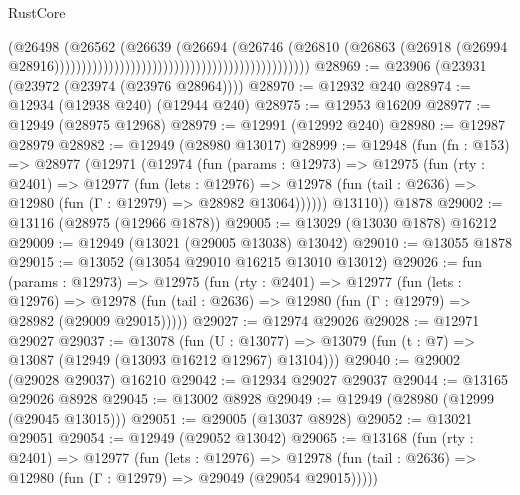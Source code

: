 \begin{lexlean}{RustCore}
\begin{coremodule}
                                                                                (@26498
                                                                                  (@26562
                                                                                    (@26639
                                                                                      (@26694
                                                                                        (@26746
                                                                                          (@26810
                                                                                            (@26863
                                                                                              (@26918
                                                                                                (@26994
                                                                                                  @28916)))))))))))))))))))))))))))))))))))))))))))))))
@28969 := @23906 (@23931 (@23972 (@23974 (@23976 @28964))))
@28970 := @12932 @240
@28974 := @12934 (@12938 @240) (@12944 @240)
@28975 := @12953 @16209
@28977 := @12949 (@28975 @12968)
@28979 := @12991 (@12992 @240)
@28980 := @12987 @28979
@28982 := @12949 (@28980 @13017)
@28999 := @12948
    (fun (fn : @153) =>
    @28977
      (@12971
        (@12974
          (fun (params : @12973) =>
          @12975
            (fun (rty : @2401) =>
            @12977
              (fun (lets : @12976) =>
              @12978 (fun (tail : @2636) => @12980 (fun (Γ : @12979) => @28982 @13064))))))
        @13110))
    @1878
@29002 := @13116 (@28975 (@12966 @1878))
@29005 := @13029 (@13030 @1878) @16212
@29009 := @12949 (@13021 (@29005 @13038) @13042)
@29010 := @13055 @1878
@29015 := @13052 (@13054 @29010 @16215 @13010 @13012)
@29026 := fun (params : @12973) =>
  @12975
    (fun (rty : @2401) =>
    @12977
      (fun (lets : @12976) =>
      @12978 (fun (tail : @2636) => @12980 (fun (Γ : @12979) => @28982 (@29009 @29015)))))
@29027 := @12974 @29026
@29028 := @12971 @29027
@29037 := @13078
    (fun (U : @13077) => @13079 (fun (t : @7) => @13087 (@12949 (@13093 @16212 @12967) @13104)))
@29040 := @29002 (@29028 @29037) @16210
@29042 := @12934 @29027 @29037
@29044 := @13165 @29026 @8928
@29045 := @13002 @8928
@29049 := @12949 (@28980 (@12999 (@29045 @13015)))
@29051 := @29005 (@13037 @8928)
@29052 := @13021 @29051
@29054 := @12949 (@29052 @13042)
@29065 := @13168
    (fun (rty : @2401) =>
    @12977
      (fun (lets : @12976) =>
      @12978 (fun (tail : @2636) => @12980 (fun (Γ : @12979) => @29049 (@29054 @29015)))))

\end{coremodule}
\end{lexlean}
